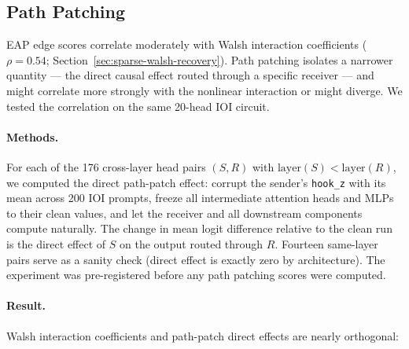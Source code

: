 \documentclass{article}
\begin{document}
%
%

\subsection{Path Patching}
\label{sec:path-patching}

EAP edge scores correlate moderately with Walsh interaction coefficients ($\rho = 0.54$; Section~\ref{sec:sparse-walsh-recovery}). Path patching
isolates a narrower quantity --- the direct causal effect routed through a
specific receiver --- and might correlate more strongly with the
nonlinear interaction or might diverge. We tested the correlation on the same
20-head IOI circuit.

\paragraph{Methods.}

For each of the 176 cross-layer head pairs $(S, R)$ with
$\text{layer}(S) < \text{layer}(R)$, we computed the direct path-patch
effect: corrupt the sender's \texttt{hook\_z} with its mean across 200
IOI prompts, freeze all intermediate attention heads and MLPs to their
clean values, and let the receiver and all downstream components compute
naturally. The change in mean logit difference relative to the clean run
is the direct effect of $S$ on the output routed through $R$. Fourteen
same-layer pairs serve as a sanity check (direct effect is exactly zero
by architecture). The experiment was pre-registered before any path
patching scores were computed.

\paragraph{Result.}

Walsh interaction coefficients and path-patch direct effects are nearly
orthogonal:
\end{document}
